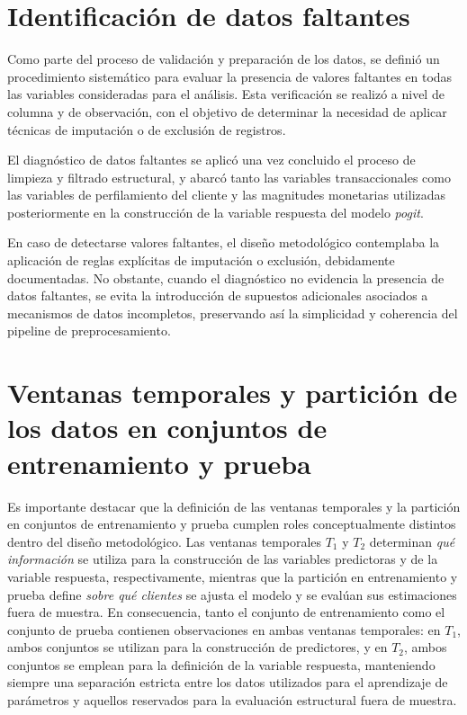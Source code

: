 \section{Identificación de datos faltantes}
    Como parte del proceso de validación y preparación de los datos, se definió un procedimiento sistemático para evaluar la presencia de valores faltantes en todas las variables consideradas para el análisis. Esta verificación se realizó a nivel de columna y de observación, con el objetivo de determinar la necesidad de aplicar técnicas de imputación o de exclusión de registros.

    El diagnóstico de datos faltantes se aplicó una vez concluido el proceso de limpieza y filtrado estructural, y abarcó tanto las variables transaccionales como las variables de perfilamiento del cliente y las magnitudes monetarias utilizadas posteriormente en la construcción de la variable respuesta del modelo \emph{pogit}.
    
    En caso de detectarse valores faltantes, el diseño metodológico contemplaba la aplicación de reglas explícitas de imputación o exclusión, debidamente documentadas. No obstante, cuando el diagnóstico no evidencia la presencia de datos faltantes, se evita la introducción de supuestos adicionales asociados a mecanismos de datos incompletos, preservando así la simplicidad y coherencia del pipeline de preprocesamiento.
    

\section{Ventanas temporales y partición de los datos en conjuntos de entrenamiento y prueba}

    Es importante destacar que la definición de las ventanas temporales y la partición en conjuntos de entrenamiento y prueba cumplen roles conceptualmente distintos dentro del diseño metodológico. Las ventanas temporales \(T_1\) y \(T_2\) determinan \emph{qué información} se utiliza para la construcción de las variables predictoras y de la variable respuesta, respectivamente, mientras que la partición en entrenamiento y prueba define \emph{sobre qué clientes} se ajusta el modelo y se evalúan sus estimaciones fuera de muestra. En consecuencia, tanto el conjunto de entrenamiento como el conjunto de prueba contienen observaciones en ambas ventanas temporales: en \(T_1\), ambos conjuntos se utilizan para la construcción de predictores, y en \(T_2\), ambos conjuntos se emplean para la definición de la variable respuesta, manteniendo siempre una separación estricta entre los datos utilizados para el aprendizaje de parámetros y aquellos reservados para la evaluación estructural fuera de muestra.


